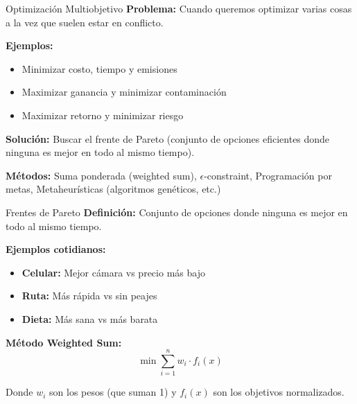 \documentclass{beamer}
\begin{document}
\begin{frame}{Optimización Multiobjetivo}
    \textbf{Problema:} Cuando queremos optimizar varias cosas a la vez que suelen estar en conflicto.
    
    \vspace{0.3cm}
    
    \textbf{Ejemplos:}
    \begin{itemize}
        \item Minimizar costo, tiempo y emisiones
        \item Maximizar ganancia y minimizar contaminación
        \item Maximizar retorno y minimizar riesgo
    \end{itemize}
    
    \vspace{0.3cm}
    
    \textbf{Solución:} Buscar el frente de Pareto (conjunto de opciones eficientes donde ninguna es mejor en todo al mismo tiempo).
    
    \vspace{0.3cm}
    
    \textbf{Métodos:} Suma ponderada (weighted sum), $\epsilon$-constraint, Programación por metas, Metaheurísticas (algoritmos genéticos, etc.)
    
\end{frame}

\begin{frame}{Frentes de Pareto}
    \textbf{Definición:} Conjunto de opciones donde ninguna es mejor en todo al mismo tiempo.
    
    \vspace{0.3cm}
    
    \textbf{Ejemplos cotidianos:}
    \begin{itemize}
        \item \textbf{Celular:} Mejor cámara vs precio más bajo
        \item \textbf{Ruta:} Más rápida vs sin peajes
        \item \textbf{Dieta:} Más sana vs más barata
    \end{itemize}
    
    \vspace{0.3cm}
    
    \textbf{Método Weighted Sum:}
    \[\min \sum_{i=1}^{n} w_i \cdot f_i(x)\]
    
    Donde $w_i$ son los pesos (que suman 1) y $f_i(x)$ son los objetivos normalizados.
\end{frame}
\end{document}
